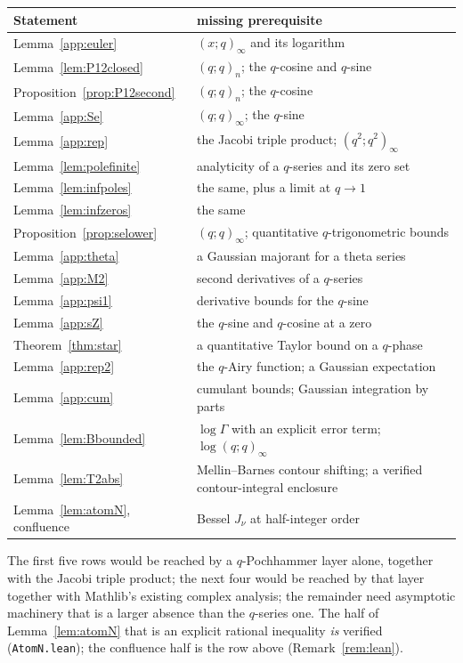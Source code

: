 \documentclass[11pt]{article}
\theoremstyle{plain}
\theoremstyle{definition}
\theoremstyle{remark}
\begin{document}
\begin{center}\small
\begin{tabular}{ll}
\hline
Statement & missing prerequisite \\
\hline
Lemma~\ref{app:euler} & $(x;q)_\infty$ and its logarithm \\
Lemma~\ref{lem:P12closed} & $(q;q)_n$; the $q$-cosine and $q$-sine \\
Proposition~\ref{prop:P12second} & $(q;q)_n$; the $q$-cosine \\
Lemma~\ref{app:Se} & $(q;q)_\infty$; the $q$-sine \\
Lemma~\ref{app:rep} & the Jacobi triple product; $(q^2;q^2)_\infty$ \\
Lemma~\ref{lem:polefinite} & analyticity of a $q$-series and its zero set \\
Lemma~\ref{lem:infpoles} & the same, plus a limit at $q\to1$ \\
Lemma~\ref{lem:infzeros} & the same \\
Proposition~\ref{prop:selower} & $(q;q)_\infty$; quantitative $q$-trigonometric bounds \\
Lemma~\ref{app:theta} & a Gaussian majorant for a theta series \\
Lemma~\ref{app:M2} & second derivatives of a $q$-series \\
Lemma~\ref{app:psi1} & derivative bounds for the $q$-sine \\
Lemma~\ref{app:sZ} & the $q$-sine and $q$-cosine at a zero \\
Theorem~\ref{thm:star} & a quantitative Taylor bound on a $q$-phase \\
Lemma~\ref{app:rep2} & the $q$-Airy function; a Gaussian expectation \\
Lemma~\ref{app:cum} & cumulant bounds; Gaussian integration by parts \\
Lemma~\ref{lem:Bbounded} & $\log\Gamma$ with an explicit error term; $\log(q;q)_\infty$ \\
Lemma~\ref{lem:T2abs} & Mellin--Barnes contour shifting; a verified contour-integral enclosure \\
Lemma~\ref{lem:atomN}, confluence & Bessel $J_\nu$ at half-integer order \\
\hline
\end{tabular}
\end{center}

\noindent The first five rows would be reached by a $q$-Pochhammer layer alone, together with the
Jacobi triple product; the next four would be reached by that layer together with Mathlib's
existing complex analysis; the remainder need asymptotic machinery that is a larger absence than
the $q$-series one. The half of Lemma~\ref{lem:atomN} that is an explicit rational inequality
\emph{is} verified (\texttt{AtomN.lean}); the confluence half is the row above
(Remark~\ref{rem:lean}).
\end{document}
